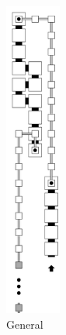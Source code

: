     \begin{figure}[H]
        \centering
        \begin{subfigure}[t]{0.2\textwidth}
            \centering
            \includegraphics[width=0.2\textwidth]{digit_top_general}
            \caption{\label{fig:digit_top_general} General}
        \end{subfigure}%
        ~
        \begin{subfigure}[t]{0.2\textwidth}
            \centering

\end{subfigure}
\end{figure}
